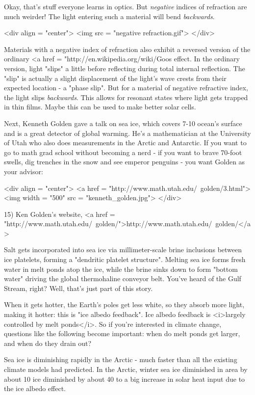 Okay, that's stuff everyone learns in optics.  But \emph{negative}
indices of refraction are much weirder!  The light entering such a
material will bend \emph{backwards}.

<div align = "center">
<img src = "negative refraction.gif">
</div>

Materials with a negative index of refraction also exhibit a reversed
version of the ordinary <a href =
"http://en.wikipedia.org/wiki/Goos%
effect.  In the ordinary version, light "slips" a little
before reflecting during total internal reflection.  The
"slip" is actually a slight displacement of the light's wave
crests from their expected location - a "phase slip".  But
for a material of negative refractive index, the light slips
\emph{backwards}.  This allows for resonant states where light gets
trapped in thin films.  Maybe this can be used to make better solar
cells.

Next, Kenneth Golden gave a talk on sea ice, which covers 7-10%
ocean's surface and is a great detector of global warming.  He's a
mathematician at the University of Utah who also does measurements in
the Arctic and Antarctic.  If you want to go to math grad school
without becoming a nerd - if you want to brave 70-foot swells, dig
trenches in the snow and see emperor penguins - you want Golden as
your advisor:

<div align = "center">
<a href = "http://www.math.utah.edu/~golden/3.html">
<img width = "500" src = "kenneth_golden.jpg">
</div>

15) Ken Golden's website, <a href =
"http://www.math.utah.edu/~golden/">http://www.math.utah.edu/~golden/</a>

Salt gets incorporated into sea ice via millimeter-scale brine
inclusions between ice platelets, forming a "dendritic platelet
structure".  Melting sea ice forms fresh water in melt ponds atop the
ice, while the brine sinks down to form "bottom water" driving the
global thermohaline conveyor belt.  You've heard of the Gulf Stream,
right?  Well, that's just part of this story.

When it gets hotter, the Earth's poles get less white, so they absorb
more light, making it hotter: this is "ice albedo feedback".  Ice
albedo feedback is <i>largely controlled by melt ponds</i>.  So if you're
interested in climate change, questions like the following become 
important: when do melt ponds get larger, and when do they drain out?

Sea ice is diminishing rapidly in the Arctic - much faster than all
the existing climate models had predicted.   In the Arctic, winter sea
ice diminished in area by about 10%
ice diminished by about 40%
to a big increase in solar heat input due to the ice
albedo effect.   

